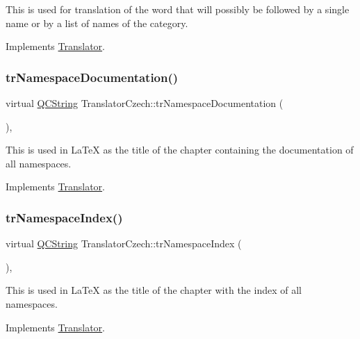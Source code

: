 This is used for translation of the word that will possibly be followed by a single name or by a list of names of the category. 

Implements \mbox{\hyperlink{class_translator}{Translator}}.

\mbox{\label{class_translator_czech_aed98b4b0372e2a01891c1da49b012800}} 
\subsubsection{\texorpdfstring{trNamespaceDocumentation()}{trNamespaceDocumentation()}}
{\footnotesize\ttfamily virtual \mbox{\hyperlink{class_q_c_string}{Q\+C\+String}} Translator\+Czech\+::tr\+Namespace\+Documentation (\begin{DoxyParamCaption}{ }\end{DoxyParamCaption})\hspace{0.3cm}{\ttfamily [inline]}, {\ttfamily [virtual]}}

This is used in La\+TeX as the title of the chapter containing the documentation of all namespaces. 

Implements \mbox{\hyperlink{class_translator}{Translator}}.

\mbox{\label{class_translator_czech_a815ce8b674d619b8943bbb8401b650cc}} 
\subsubsection{\texorpdfstring{trNamespaceIndex()}{trNamespaceIndex()}}
{\footnotesize\ttfamily virtual \mbox{\hyperlink{class_q_c_string}{Q\+C\+String}} Translator\+Czech\+::tr\+Namespace\+Index (\begin{DoxyParamCaption}{ }\end{DoxyParamCaption})\hspace{0.3cm}{\ttfamily [inline]}, {\ttfamily [virtual]}}

This is used in La\+TeX as the title of the chapter with the index of all namespaces. 

Implements \mbox{\hyperlink{class_translator}{Translator}}.

